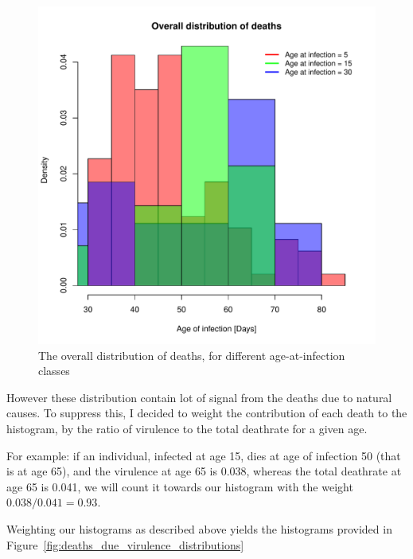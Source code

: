 \documentclass[10pt]{article}         %
\begin{document}
\begin{figure}[ht!]
    \includegraphics[width=\textwidth]{Overall_distribution_of_deaths.pdf}
    \caption{The overall distribution of deaths, for different age-at-infection classes}
\label{fig:death_distributions}
\end{figure}
\FloatBarrier

However these distribution contain lot of signal from the deaths due to natural causes. To suppress this, I decided to weight the contribution of each death to the histogram, by the ratio of virulence to the total deathrate for a given age.

For example: if an individual, infected at age 15, dies at age of infection 50 (that is at age 65), and the virulence at age 65 is 0.038, whereas the total deathrate at age 65 is 0.041, we will count it towards our histogram with the weight $0.038/0.041= 0.93$.

Weighting our histograms as described above yields the histograms provided in Figure~\ref{fig:deaths_due_virulence_distributions}
\end{document}
